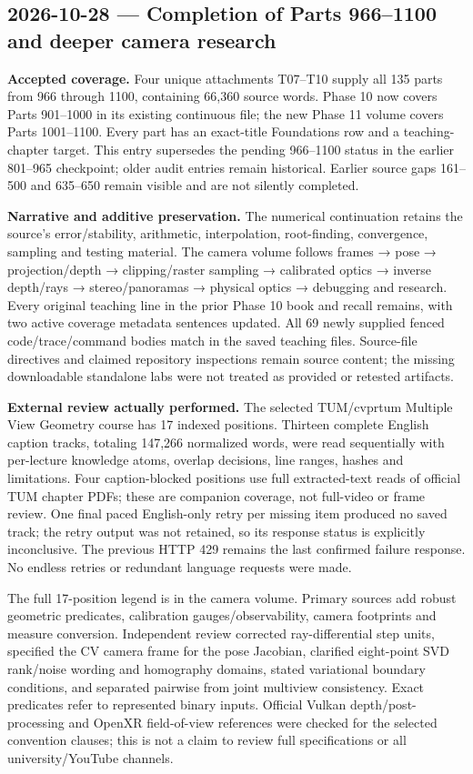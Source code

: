 \subsection{2026-10-28 --- Completion of Parts 966--1100 and deeper camera research}\label{appendix-a103e7846d21-completion-of-parts-9661100-and-deeper-camera-research}

\textbf{Accepted coverage.} Four unique attachments T07--T10 supply all 135 parts from 966 through 1100, containing 66,360 source words. Phase 10 now covers Parts 901--1000 in its existing continuous file; the new Phase 11 volume covers Parts 1001--1100. Every part has an exact-title Foundations row and a teaching-chapter target. This entry supersedes the pending 966--1100 status in the earlier 801--965 checkpoint; older audit entries remain historical. Earlier source gaps 161--500 and 635--650 remain visible and are not silently completed.

\textbf{Narrative and additive preservation.} The numerical continuation retains the source's error/stability, arithmetic, interpolation, root-finding, convergence, sampling and testing material. The camera volume follows frames → pose → projection/depth → clipping/raster sampling → calibrated optics → inverse depth/rays → stereo/panoramas → physical optics → debugging and research. Every original teaching line in the prior Phase 10 book and recall remains, with two active coverage metadata sentences updated. All 69 newly supplied fenced code/trace/command bodies match in the saved teaching files. Source-file directives and claimed repository inspections remain source content; the missing downloadable standalone labs were not treated as provided or retested artifacts.

\textbf{External review actually performed.} The selected TUM/cvprtum Multiple View Geometry course has 17 indexed positions. Thirteen complete English caption tracks, totaling 147,266 normalized words, were read sequentially with per-lecture knowledge atoms, overlap decisions, line ranges, hashes and limitations. Four caption-blocked positions use full extracted-text reads of official TUM chapter PDFs; these are companion coverage, not full-video or frame review. One final paced English-only retry per missing item produced no saved track; the retry output was not retained, so its response status is explicitly inconclusive. The previous HTTP 429 remains the last confirmed failure response. No endless retries or redundant language requests were made.

The full 17-position legend is in the camera volume. Primary sources add robust geometric predicates, calibration gauges/observability, camera footprints and measure conversion. Independent review corrected ray-differential step units, specified the CV camera frame for the pose Jacobian, clarified eight-point SVD rank/noise wording and homography domains, stated variational boundary conditions, and separated pairwise from joint multiview consistency. Exact predicates refer to represented binary inputs. Official Vulkan depth/post-processing and OpenXR field-of-view references were checked for the selected convention clauses; this is not a claim to review full specifications or all university/YouTube channels.

